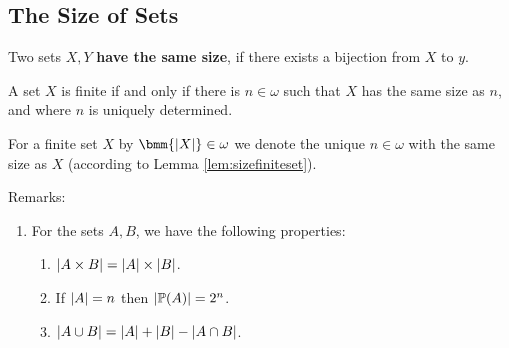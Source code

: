 \documentclass[12pt]{book}
\begin{document}

\subsection{The Size of Sets}
\label{sec:sizeofsets}

\begin{defi}\label{def:equalsize}
  Two sets $X, Y$ \textbf{have the same size}, if there exists a bijection from $X$ to $y$.
\end{defi}

\begin{lem}\label{lem:sizefiniteset}
  A set $X$ is finite if and only if there is $n \in \omega$ such that $X$ has the same size as $n$, and where $n$ is uniquely determined.
\end{lem}

\begin{defi}\label{def:sizefiniteset}
  For a finite set $X$ by $\bmm{\abs{X}} \in \omega$ we denote the unique $n \in \omega$ with the same size as $X$ (according to Lemma \ref{lem:sizefiniteset}).
\end{defi}
Remarks:
\begin{enumerate}
  \item For the sets $A , B$, we have the following properties:
   \begin{enumerate}
     \item $\lvert A \times B  \rvert= \lvert A \rvert \times \lvert B \rvert$.
	 \item If $\lvert A \rvert = n$ then $\lvert \operatorname{\mathbb{P}}(A) \rvert = 2^n$.
	 \item $\lvert A \cup B \rvert = \lvert A \rvert + \lvert B \rvert - \lvert A \cap B \rvert$.
   \end{enumerate} 
 \end{enumerate}


\end{document}
